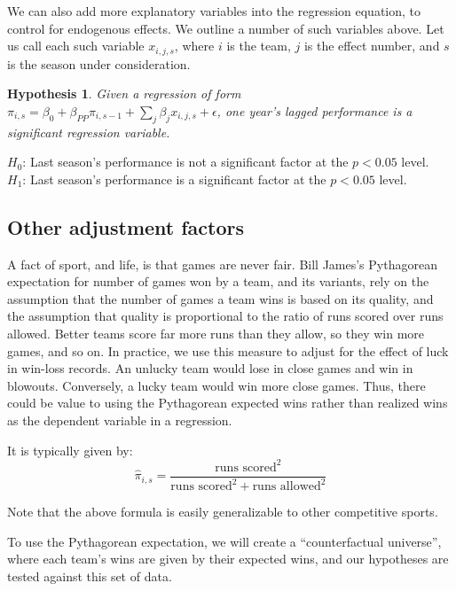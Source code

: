 \documentclass[11pt,]{scrartcl}
\newtheorem{hypothesis}{Hypothesis}
\begin{document}
We can also add more explanatory variables into the regression equation,
to control for endogenous effects. We outline a number of such variables
above. Let us call each such variable \(x_{i, j, s}\), where \(i\) is
the team, \(j\) is the effect number, and \(s\) is the season under
consideration.

\begin{framed}
\begin{hypothesis}
Given a regression of form $\pi_{i,s} = \beta_0 + \beta_{PP} \pi_{i, s-1} + \sum_{j}\beta_j x_{i, j, s} + \epsilon$, one year's lagged performance is a significant regression variable.
\end{hypothesis}

\noindent $H_0$: Last season's performance is not a significant factor at the $p < 0.05$ level. \\
$H_1$: Last season's performance is a significant factor at the $p < 0.05$ level.
\end{framed}

\subsection{Other adjustment factors}\label{other-adjustment-factors}

A fact of sport, and life, is that games are never fair. Bill James's
Pythagorean expectation for number of games won by a team, and its
variants, rely on the assumption that the number of games a team wins is
based on its quality, and the assumption that quality is proportional to
the ratio of runs scored over runs allowed. Better teams score far more
runs than they allow, so they win more games, and so on. In practice, we
use this measure to adjust for the effect of luck in win-loss records.
An unlucky team would lose in close games and win in blowouts.
Conversely, a lucky team would win more close games. Thus, there could
be value to using the Pythagorean expected wins rather than realized
wins as the dependent variable in a regression.

It is typically given by:
\[\hat\pi_{i, s} = \frac{\text{runs scored}^2}{\text{runs scored}^2 + \text{runs allowed} ^2}\]

Note that the above formula is easily generalizable to other competitive
sports.

To use the Pythagorean expectation, we will create a ``counterfactual
universe'', where each team's wins are given by their expected wins, and
our hypotheses are tested against this set of data.
\end{document}
